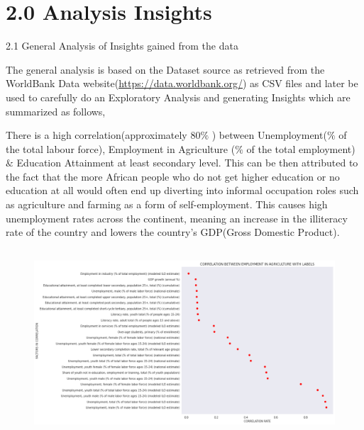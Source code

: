 \documentclass[12pt]{article}
\renewcommand{\_}{\kern-1.5pt\textunderscore\kern-1.5pt}
\begin{document}
\section*{2.0 Analysis Insights }
\textcolor[HTML]{666666}{2.1 General Analysis of Insights gained from the data}

\vspace{\baselineskip}
\begin{justify}
{\fontsize{9pt}{10.8pt}\selectfont The general analysis is based on the Dataset source as retrieved from the WorldBank Data website(\href{https://data.worldbank.org/}{\textcolor[HTML]{3C78D8}{\ul{https://data.worldbank.org/}}}) as CSV files and later be used to carefully do an Exploratory Analysis and generating Insights which are summarized as follows, \par}
\end{justify}

\vspace{\baselineskip}
\begin{justify}
{\fontsize{9pt}{10.8pt}\selectfont There is a high correlation(approximately 80$\%$ ) between Unemployment($\%$  of the total labour force), Employment in Agriculture ($\%$  of the total employment) $\&$  Education Attainment at least secondary level. This can be then attributed to the fact that the more African people who do not get higher education or no education at all would often end up diverting into informal occupation roles such as agriculture and farming as a form of self-employment. This causes high unemployment rates across the continent, meaning an increase in the illiteracy rate of the country and lowers the country’s GDP(Gross Domestic Product).\par}
\end{justify}



\begin{figure}[H]
	\begin{Center}
		\includegraphics[width=6.21in,height=2.74in]{./media/image3.png}
	\end{Center}
\end{figure}
\end{document}
